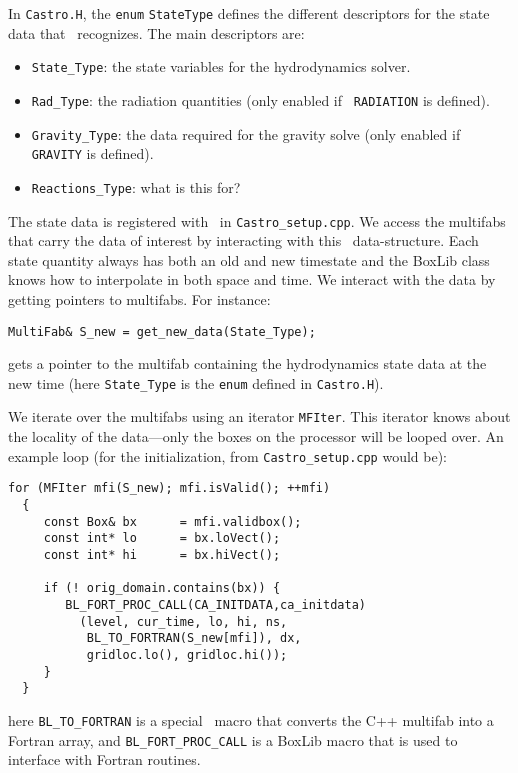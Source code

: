 In {\tt Castro.H}, the {\tt enum} {\tt StateType} defines the
different descriptors for the state data that \castro\ recognizes.
The main descriptors are:
\begin{itemize}
\item {\tt State\_Type}: the state variables for the hydrodynamics solver.

\item {\tt Rad\_Type}: the radiation quantities (only enabled if {\tt
  RADIATION} is defined).

\item {\tt Gravity\_Type}: the data required for the gravity solve (only
  enabled if {\tt GRAVITY} is defined).

\item {\tt Reactions\_Type}: {\color{red} what is this for?}
\end{itemize}

The state data is registered with \boxlib\ in {\tt Castro\_setup.cpp}.
We access the multifabs that carry the data of interest by interacting
with this \boxlib\ data-structure.  Each state quantity always has both
an old and new timestate and the BoxLib class knows how to interpolate
in both space and time.  We interact with the data by getting pointers
to multifabs.  For instance:
\begin{lstlisting}
MultiFab& S_new = get_new_data(State_Type);
\end{lstlisting}
gets a pointer to the multifab containing the hydrodynamics state data
at the new time (here {\tt State\_Type} is the {\tt enum} defined in 
{\tt Castro.H}).

We iterate over the multifabs using an iterator {\tt MFIter}.  This
iterator knows about the locality of the data---only the boxes on the
processor will be looped over.  An example loop (for the
initialization, from {\tt Castro\_setup.cpp} would be):
\begin{lstlisting}
for (MFIter mfi(S_new); mfi.isValid(); ++mfi)
  {
     const Box& bx      = mfi.validbox();
     const int* lo      = bx.loVect();
     const int* hi      = bx.hiVect();

     if (! orig_domain.contains(bx)) {
        BL_FORT_PROC_CALL(CA_INITDATA,ca_initdata)
          (level, cur_time, lo, hi, ns,
           BL_TO_FORTRAN(S_new[mfi]), dx,
           gridloc.lo(), gridloc.hi());
     }
  }
\end{lstlisting}
here {\tt BL\_TO\_FORTRAN} is a special \boxlib\ macro that converts the
C++ multifab into a Fortran array, and {\tt BL\_FORT\_PROC\_CALL}
is a BoxLib macro that is used to interface with Fortran routines.

